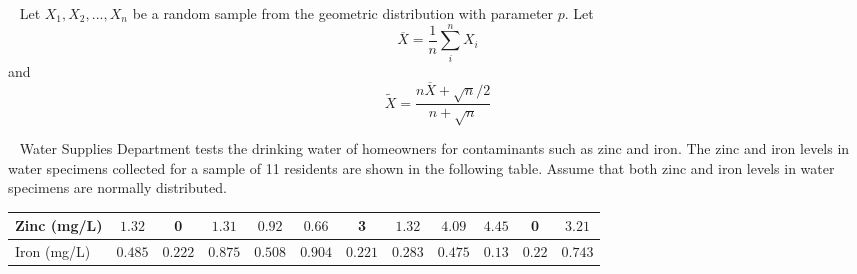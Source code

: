 \documentclass[letterpaper,10pt,addpoints]{exam}
\begin{document}
\begin{questions}
\question[20]~
Let $X_1,X_2,...,X_n$ be a random sample from the geometric distribution with parameter $p$. Let $$\overline{X} = \frac{1}{n}\sum_i^n X_i$$ and $$\tilde{X} = \frac{n\overline{X}+\sqrt{n}/2}{n+\sqrt{n}}$$


\question[30]~
Water Supplies Department tests the drinking water of homeowners for contaminants such as zinc and iron. The zinc and iron levels in water specimens collected for a sample of 11 residents are shown in the following table. Assume that both zinc and iron levels in water specimens are normally distributed.

\begin{tabular}{|l|c|c|c|c|c|c|c|c|c|c|c|}
\hline Zinc (mg/L) & $1.32$ & 0 & $1.31$ & $0.92$ & $0.66$ & 3 & $1.32$ & $4.09$ & $4.45$ & 0 & $3.21$ \\
\hline Iron (mg/L) & $0.485$ & $0.222$ & $0.875$ & $0.508$ & $0.904$ & $0.221$ & $0.283$ & $0.475$ & $0.13$ & $0.22$ & $0.743$ \\
\hline
\end{tabular}
\end{questions}
\end{document}
